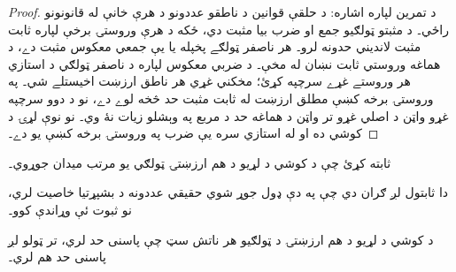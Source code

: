 \documentclass[../../../include/open-logic-section]{subfiles}
\begin{document}
\begin{proof}
د تمرين لپاره اشاره: د حلقې قوانين د ناطقو عددونو د هرې خانې له
قانونونو راځي۔ د مثبتو ټولګيو جمع او ضرب بيا مثبت دي، ځکه د
هرې وروستۍ برخې لپاره ثابت مثبت لانديني حدونه لرو۔ هر ناصفر
ټولګے پخپله يا يې جمعي معکوس مثبت دے، د هماغه وروستي ثابت نښان
له مخې۔ د ضربي معکوس لپاره د ناصفر ټولګي د استازي هر وروستے
غړے سرچپه کړئ؛ مخکني غړي هر ناطق ارزښت اخيستلے شي۔ په وروستۍ
برخه کښې مطلق ارزښت له ثابت مثبت حد څخه لوے دے، نو د دوو سرچپه
غړو واټن د اصلي غړو تر واټن د هماغه حد د مربع په وېشلو زيات
نۀ وي۔ نو نوې لړۍ د کوشي ده او له استازي سره يې ضرب په وروستۍ
برخه کښې يو دے۔
\end{proof}

\begin{prob}
ثابته کړئ چې د کوشي د لړيو د هم ارزښتۍ ټولګي يو مرتب ميدان جوړوي۔
\end{prob}

دا ثابتول لږ ګران دي چې په دې ډول جوړ شوي حقيقي عددونه د بشپړتيا
خاصيت لري، نو ثبوت ئې وړاندې کوو۔

\begin{thm}
د کوشي د لړيو د هم ارزښتۍ د ټولګيو هر ناتش سټ چې پاسنی حد لري،
تر ټولو لږ پاسنی حد هم لري۔
\end{thm}
\end{document}
